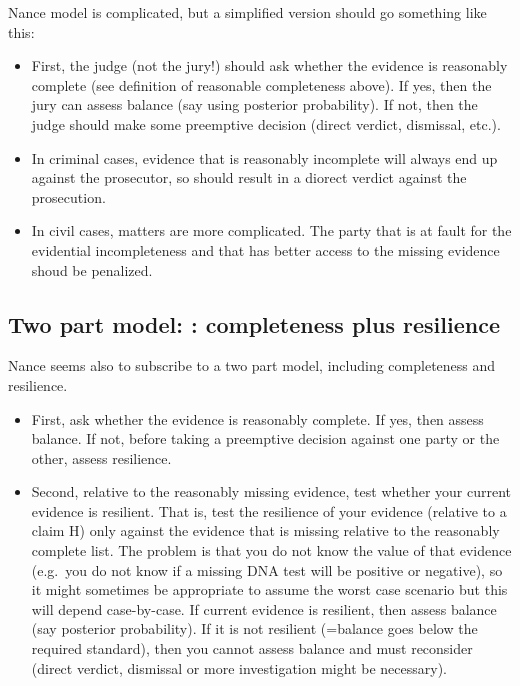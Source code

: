 \documentclass[
  10pt,
  dvipsnames,enabledeprecatedfontcommands]{scrartcl}
\begin{document}
Nance model is complicated, but a simplified version should go something
like this:

\begin{itemize}
\item
  First, the judge (not the jury!) should ask whether the evidence is
  reasonably complete (see definition of reasonable completeness above).
  If yes, then the jury can assess balance (say using posterior
  probability). If not, then the judge should make some preemptive
  decision (direct verdict, dismissal, etc.).
\item
  In criminal cases, evidence that is reasonably incomplete will always
  end up against the prosecutor, so should result in a diorect verdict
  against the prosecution.
\item
  In civil cases, matters are more complicated. The party that is at
  fault for the evidential incompleteness and that has better access to
  the missing evidence shoud be penalized.
\end{itemize}

\hypertarget{two-part-model-completeness-plus-resilience}{%
\subsection{Two part model: : completeness plus
resilience}\label{two-part-model-completeness-plus-resilience}}

Nance seems also to subscribe to a two part model, including
completeness and resilience.

\begin{itemize}
\item
  First, ask whether the evidence is reasonably complete. If yes, then
  assess balance. If not, before taking a preemptive decision against
  one party or the other, assess resilience.
\item
  Second, relative to the reasonably missing evidence, test whether your
  current evidence is resilient. That is, test the resilience of your
  evidence (relative to a claim H) only against the evidence that is
  missing relative to the reasonably complete list. The problem is that
  you do not know the value of that evidence (e.g.~you do not know if a
  missing DNA test will be positive or negative), so it might sometimes
  be appropriate to assume the worst case scenario but this will depend
  case-by-case. If current evidence is resilient, then assess balance
  (say posterior probability). If it is not resilient (=balance goes
  below the required standard), then you cannot assess balance and must
  reconsider (direct verdict, dismissal or more investigation might be
  necessary).
\end{itemize}
\end{document}
